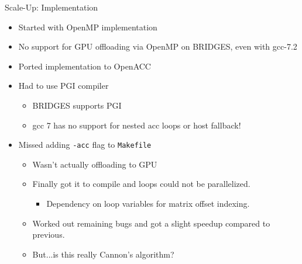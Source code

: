 \documentclass{beamer}
\begin{document}
\begin{frame}{Scale-Up: Implementation}
  \begin{itemize}
  \item{Started with OpenMP implementation}
  \item{No support for GPU offloading via OpenMP on BRIDGES, even with gcc-7.2}
  \item{Ported implementation to OpenACC}
  \item{Had to use PGI compiler}
    \begin{itemize}
    \item{BRIDGES supports PGI\autocite{BridgesGPUGuide}}
    \item{gcc 7 has no support for nested acc loops or host fallback!\autocite{gccOpenACC}}
    \end{itemize}
  \item{Missed adding \texttt{-acc} flag to \texttt{Makefile}}
    \begin{itemize}
    \item{Wasn't actually offloading to GPU}
    \item{Finally got it to compile and loops could not be parallelized.}
      \begin{itemize}
      \item{Dependency on loop variables for matrix offset indexing.}
      \end{itemize}
    \item{Worked out remaining bugs and got a slight speedup compared to previous.}
    \item{But...is this really Cannon's algorithm?}
    \end{itemize}
  \end{itemize}  
\end{frame}
\end{document}

